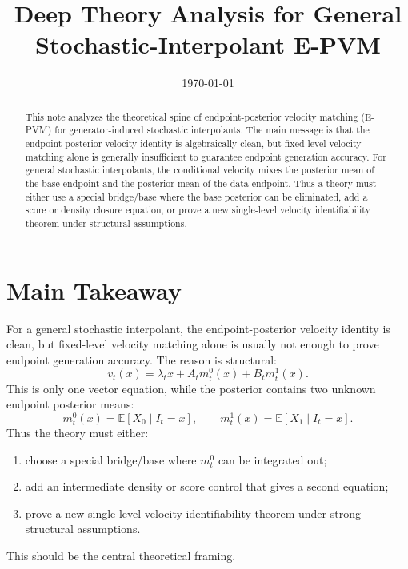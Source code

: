 \documentclass[11pt]{article}
\title{Deep Theory Analysis for General Stochastic-Interpolant E-PVM}
\author{}
\date{\today}
\newcommand{\E}{\mathbb{E}}
\theoremstyle{plain}
\theoremstyle{definition}
\begin{document}
\maketitle

\begin{abstract}
This note analyzes the theoretical spine of endpoint-posterior velocity matching
(E-PVM) for generator-induced stochastic interpolants. The main message is that
the endpoint-posterior velocity identity is algebraically clean, but fixed-level
velocity matching alone is generally insufficient to guarantee endpoint
generation accuracy. For general stochastic interpolants, the conditional
velocity mixes the posterior mean of the base endpoint and the posterior mean of
the data endpoint. Thus a theory must either use a special bridge/base where the
base posterior can be eliminated, add a score or density closure equation, or
prove a new single-level velocity identifiability theorem under structural
assumptions.
\end{abstract}

\tableofcontents

\section{Main Takeaway}

For a general stochastic interpolant, the endpoint-posterior velocity identity
is clean, but fixed-level velocity matching alone is usually not enough to prove
endpoint generation accuracy. The reason is structural:
\begin{equation}
v_t(x)
=
\lambda_t x
+A_t m_t^0(x)
+B_t m_t^1(x).
\end{equation}
This is only one vector equation, while the posterior contains two unknown
endpoint posterior means:
\begin{equation}
m_t^0(x)=\E[X_0\mid I_t=x],
\qquad
m_t^1(x)=\E[X_1\mid I_t=x].
\end{equation}
Thus the theory must either:
\begin{enumerate}[label=(\roman*)]
\item choose a special bridge/base where \(m_t^0\) can be integrated out;
\item add an intermediate density or score control that gives a second equation;
\item prove a new single-level velocity identifiability theorem under strong
structural assumptions.
\end{enumerate}
This should be the central theoretical framing.
\end{document}
